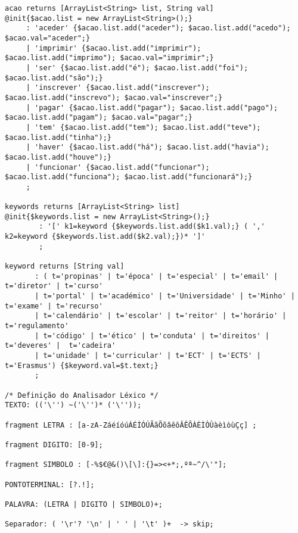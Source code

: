 \begin{changemargin}{-3cm}{0cm}
\begin{verbatim}
acao returns [ArrayList<String> list, String val]
@init{$acao.list = new ArrayList<String>();}
     : 'aceder' {$acao.list.add("aceder"); $acao.list.add("acedo"); $acao.val="aceder";} 
     | 'imprimir' {$acao.list.add("imprimir"); $acao.list.add("imprimo"); $acao.val="imprimir";} 
     | 'ser' {$acao.list.add("é"); $acao.list.add("foi"); $acao.list.add("são");} 
     | 'inscrever' {$acao.list.add("inscrever"); $acao.list.add("inscrevo"); $acao.val="inscrever";} 
     | 'pagar' {$acao.list.add("pagar"); $acao.list.add("pago"); $acao.list.add("pagam"); $acao.val="pagar";} 
     | 'tem' {$acao.list.add("tem"); $acao.list.add("teve"); $acao.list.add("tinha");}
     | 'haver' {$acao.list.add("há"); $acao.list.add("havia"); $acao.list.add("houve");}
     | 'funcionar' {$acao.list.add("funcionar"); $acao.list.add("funciona"); $acao.list.add("funcionará");}
     ;

keywords returns [ArrayList<String> list]
@init{$keywords.list = new ArrayList<String>();}
        : '[' k1=keyword {$keywords.list.add($k1.val);} ( ',' k2=keyword {$keywords.list.add($k2.val);})* ']' 
        ;

keyword returns [String val]
       : ( t='propinas' | t='época' | t='especial' | t='email' | t='diretor' | t='curso' 
       | t='portal' | t='académico' | t='Universidade' | t='Minho' | t='exame' | t='recurso' 
       | t='calendário' | t='escolar' | t='reitor' | t='horário' | t='regulamento' 
       | t='código' | t='ético' | t='conduta' | t='direitos' | t='deveres' |  t='cadeira' 
       | t='unidade' | t='curricular' | t='ECT' | t='ECTS' | t='Erasmus') {$keyword.val=$t.text;}
       ;

/* Definição do Analisador Léxico */         
TEXTO: (('\'') ~('\'')* ('\''));

fragment LETRA : [a-zA-ZáéíóúÁÉÍÓÚÃãÕõâêôÂÊÔÀÈÌÒÙàèìòùÇç] ;

fragment DIGITO: [0-9];

fragment SIMBOLO : [-%$€@&()\[\]:{}=><+*;,ºª~^/\'"];

PONTOTERMINAL: [?.!];

PALAVRA: (LETRA | DIGITO | SIMBOLO)+;

Separador: ( '\r'? '\n' | ' ' | '\t' )+  -> skip; 
\end{verbatim}
\end{changemargin}
